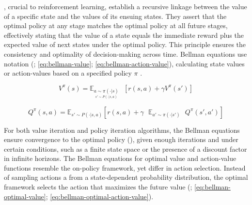     \noindent {}, crucial to reinforcement learning, establish a recursive linkage between the value of a specific state and the values of its ensuing states. They assert that the optimal policy at any stage matches the optimal policy at all future stages, effectively stating that the value of a state equals the immediate reward plus the expected value of next states under the optimal policy. This principle ensures the consistency and optimality of decision-making across time. Bellman equations use  notation (\textcolor{deepblue}{\cite{Sutton1998}; \autoref{eq:bellman-value}; \autoref{eq:bellman-action-value}}), calculating state values or action-values based on a specified policy $\pi$ \protect \footnotemark. 
    
    
    \begin{equation}
        V^{\pi}(s) = \mathbb{E}_{\underset{s' \sim P(\cdot | s, a)}{a \sim \pi(\cdot | s)}} \text{ } [r(s,a) + \gamma V^{\pi}(s')]
        \label{eq:bellman-value}
    \end{equation}
    
    \begin{equation}
        Q^{\pi}(s, a) = \mathbb{E}_{s' \sim P(\cdot | s, a)} [r(s,a) + \gamma \text{ } \mathbb{E}_{a' \sim \pi(\cdot | s')} \text{ } Q^{\pi}(s', a')]
        \label{eq:bellman-action-value}
    \end{equation}
    
    \noindent For both value iteration and policy iteration algorithms, the Bellman equations ensure convergence to the optimal policy (\textcolor{deepblue}{\cite{Sutton1998}}), given enough iterations and under certain conditions, such as a finite state space or the presence of a discount factor in infinite horizons. The Bellman equations for optimal value and action-value functions resemble the on-policy framework, yet differ in action selection. Instead of sampling actions a from a state-dependent probability distribution, the optimal framework selects the action that maximizes the future value (\textcolor{deepblue}{\cite{Sutton1998}; \autoref{eq:bellman-optimal-value}; \autoref{eq:bellman-optimal-action-value}}).
    
